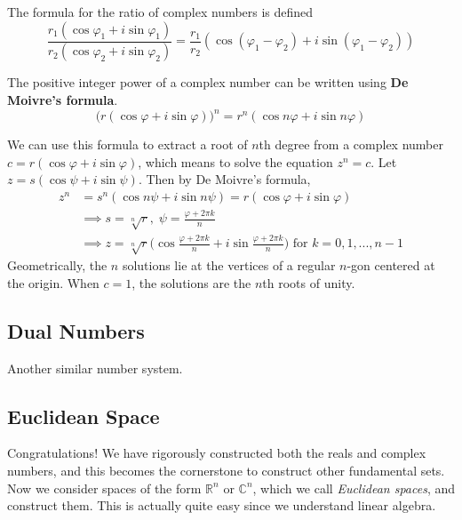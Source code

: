   \begin{corollary}
    The formula for the ratio of complex numbers is defined
    \begin{equation}
      \frac{r_1 (\cos{\varphi_1} + i \sin{\varphi_1})}{r_2 (\cos{\varphi_2} + i \sin{\varphi_2})} = \frac{r_1}{r_2} (\cos{(\varphi_1 - \varphi_2)} + i \sin{(\varphi_1 - \varphi_2)})
    \end{equation}
  \end{corollary}

  \begin{corollary}
    The positive integer power of a complex number can be written using \textbf{De Moivre's formula}. 
    \begin{equation}
      \big(r(\cos{\varphi} + i \sin{\varphi})\big)^n = r^n (\cos{n \varphi} + i \sin{n \varphi})
    \end{equation}
  \end{corollary}

  We can use this formula to extract a root of $n$th degree from a complex number $c = r(\cos{\varphi} + i \sin{\varphi})$, which means to solve the equation $z^n = c$. Let $z = s (\cos{\psi} + i \sin{\psi})$. Then by De Moivre's formula, 
  \begin{align*}
    z^n & = s^n (\cos{n \psi} + i \sin{n \psi}) = r(\cos{\varphi} + i \sin{\varphi}) \\
    & \implies s = \sqrt[n]{r}, \; \psi = \frac{\varphi + 2\pi k}{n} \\
    & \implies z = \sqrt[n]{r} \bigg( \cos{\frac{\varphi + 2\pi k}{n}} + i \sin{\frac{\varphi + 2\pi k}{n}}\bigg) \text{ for } k = 0, 1, ..., n-1
  \end{align*}
  Geometrically, the $n$ solutions lie at the vertices of a regular $n$-gon centered at the origin. When $c = 1$, the solutions are the $n$th roots of unity.

\subsection{Dual Numbers}

  Another similar number system. 

\subsection{Euclidean Space} 

  Congratulations! We have rigorously constructed both the reals and complex numbers, and this becomes the cornerstone to construct other fundamental sets. Now we consider spaces of the form $\mathbb{R}^n$ or $\mathbb{C}^n$, which we call \textit{Euclidean spaces}, and construct them. This is actually quite easy since we understand linear algebra. 

